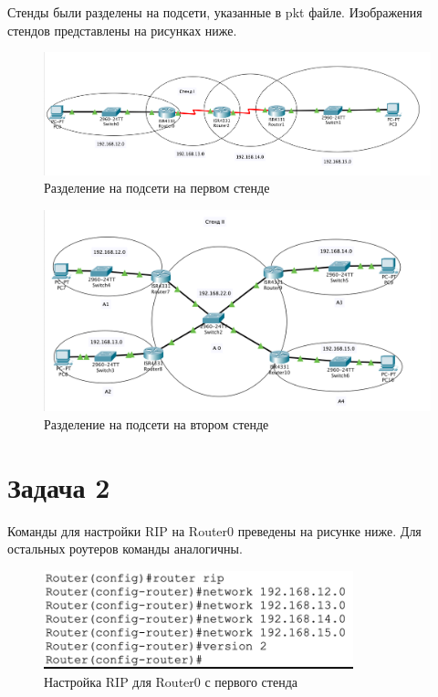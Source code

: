 Стенды были разделены на подсети, указанные в pkt файле. Изображения стендов представлены на рисунках ниже. 

\begin{figure}[H]
    \centering
    \includegraphics[width=1\textwidth]{images/1.png}
    \caption{Разделение на подсети на первом стенде}
    \label{fig:stand1}
\end{figure}

\begin{figure}[H]
    \centering
    \includegraphics[width=1\textwidth]{images/stend_2.png}
    \caption{Разделение на подсети на втором стенде}
    \label{fig:stand2}
\end{figure}

\section{Задача 2}%
\label{sec:2}

Команды для настройки RIP на Router0 преведены на рисунке ниже. Для остальных роутеров команды аналогичны.

\begin{figure}[H]
    \centering
    \includegraphics[width=0.8\textwidth]{images/2.png}
    \caption{Настройка RIP для Router0 с первого стенда}
    \label{fig:rip}
\end{figure}

